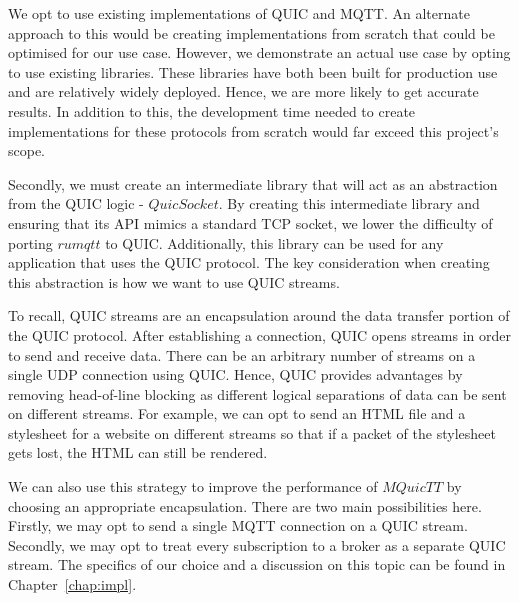 We opt to use existing implementations of QUIC and MQTT.
An alternate approach to this would be creating implementations from scratch that could be optimised for our use case.
However, we demonstrate an actual use case by opting to use existing libraries.
These libraries have both been built for production use and are relatively widely deployed.
Hence, we are more likely to get accurate results.
In addition to this, the development time needed to create implementations for these protocols from scratch would far exceed this project's scope.

Secondly, we must create an intermediate library that will act as an abstraction from the QUIC logic - $QuicSocket$.
By creating this intermediate library and ensuring that its API mimics a standard TCP socket, we lower the difficulty of porting $rumqtt$ to QUIC.
Additionally, this library can be used for any application that uses the QUIC protocol.
The key consideration when creating this abstraction is how we want to use QUIC streams.

To recall, QUIC streams are an encapsulation around the data transfer portion of the QUIC protocol.
After establishing a connection, QUIC opens streams in order to send and receive data.
There can be an arbitrary number of streams on a single UDP connection using QUIC.
Hence, QUIC provides advantages by removing head-of-line blocking as different logical separations of data can be sent on different streams.
For example, we can opt to send an HTML file and a stylesheet for a website on different streams so that if a packet of the stylesheet gets lost, the HTML can still be rendered.

We can also use this strategy to improve the performance of $MQuicTT$ by choosing an appropriate encapsulation.
There are two main possibilities here.
Firstly, we may opt to send a single MQTT connection on a QUIC stream.
Secondly, we may opt to treat every subscription to a broker as a separate QUIC stream.
The specifics of our choice and a discussion on this topic can be found in Chapter~\ref{chap:impl}.

